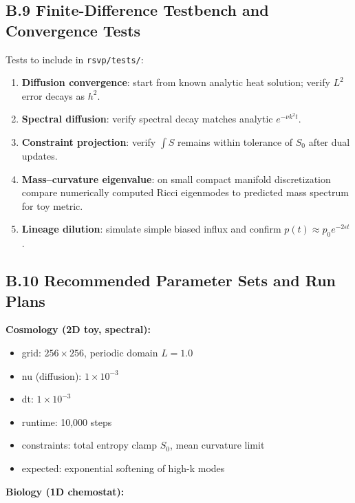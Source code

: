 \documentclass[11pt,a4paper]{article}
\begin{document}
\subsection{B.9 Finite-Difference Testbench and Convergence Tests}

Tests to include in \texttt{rsvp/tests/}:

\begin{enumerate}
  \item \textbf{Diffusion convergence}: start from known analytic heat solution; verify \(L^2\) error decays as \(h^2\).
  \item \textbf{Spectral diffusion}: verify spectral decay matches analytic \(e^{-\nu k^2 t}\).
  \item \textbf{Constraint projection}: verify \(\int S\) remains within tolerance of \(S_0\) after dual updates.
  \item \textbf{Mass–curvature eigenvalue}: on small compact manifold discretization compare numerically computed Ricci eigenmodes to predicted mass spectrum for toy metric.
  \item \textbf{Lineage dilution}: simulate simple biased influx and confirm \(p(t) \approx p_0 e^{-2\epsilon t}\).
\end{enumerate}

\subsection{B.10 Recommended Parameter Sets and Run Plans}

\textbf{Cosmology (2D toy, spectral):}

\begin{itemize}
  \item grid: \(256\times256\), periodic domain \(L=1.0\)
  \item nu (diffusion): \(1\times 10^{-3}\)
  \item dt: \(1\times 10^{-3}\)
  \item runtime: 10,000 steps
  \item constraints: total entropy clamp \(S_0\), mean curvature limit
  \item expected: exponential softening of high-k modes
\end{itemize}

\textbf{Biology (1D chemostat):}
\end{document}
